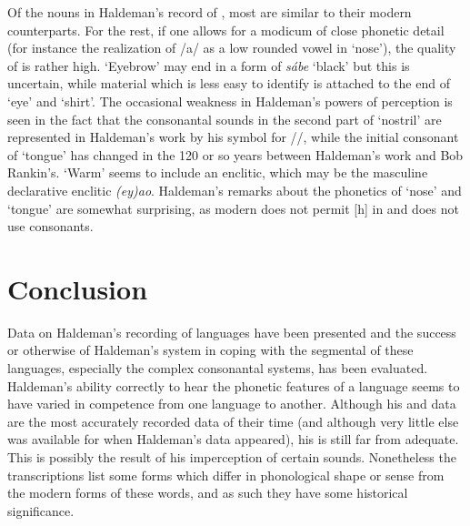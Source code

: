 \documentclass[output=paper]{LSP/langsci}
\begin{document}
Of the nouns in Haldeman's record of , most are similar to their modern counterparts.  For the rest, if one allows for a modicum of close phonetic detail (for instance the realization of /a/ as a low rounded vowel in `nose'), the quality of  is rather high. `Eyebrow' may end in a form of \textit{s\'abe} `black' but this is uncertain, while material which is less easy to identify is attached to the end of `eye' and `shirt'.  The occasional weakness in Haldeman's powers of perception is seen in the fact that the consonantal sounds in the second part of `nostril' are represented in Haldeman's work by his symbol for //, while the initial consonant of `tongue' has changed in the 120 or so years between Haldeman's work and Bob Rankin's.  `Warm' seems to include an enclitic, which may be the masculine declarative enclitic \textit{(ey)ao}.  Haldeman's remarks about the phonetics of `nose' and `tongue' are somewhat surprising, as modern  does not permit [h] in  and does not use  consonants.


\section{Conclusion}
 
Data on Haldeman's recording of  languages have been presented and the success or otherwise of Haldeman's system in coping with the segmental  of these languages, especially the complex consonantal systems, has been evaluated. Haldeman's ability correctly to hear the phonetic features of a language seems to have varied in competence from one language to another.  Although his  and  data are the most accurately recorded  data of their time (and although very little else was available for  when Haldeman's data appeared), his  is still far from adequate.  This is possibly the result of his imperception of certain sounds.  Nonetheless the transcriptions list some forms which differ in phonological shape or sense from the modern forms of these words, and as such they have some historical significance. 
 
\end{document}
